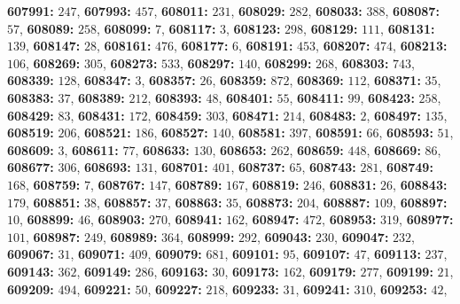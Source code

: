 \textsf{\bfseries 607991:} $247$, \textsf{\bfseries 607993:} $457$, \textsf{\bfseries 608011:} $231$, \textsf{\bfseries 608029:} $282$, \textsf{\bfseries 608033:} $388$, \textsf{\bfseries 608087:} $57$, \textsf{\bfseries 608089:} $258$, \textsf{\bfseries 608099:} $7$, \textsf{\bfseries 608117:} $3$, \textsf{\bfseries 608123:} $298$, \textsf{\bfseries 608129:} $111$, \textsf{\bfseries 608131:} $139$, \textsf{\bfseries 608147:} $28$, \textsf{\bfseries 608161:} $476$, \textsf{\bfseries 608177:} $6$, \textsf{\bfseries 608191:} $453$, \textsf{\bfseries 608207:} $474$, \textsf{\bfseries 608213:} $106$, \textsf{\bfseries 608269:} $305$, \textsf{\bfseries 608273:} $533$, \textsf{\bfseries 608297:} $140$, \textsf{\bfseries 608299:} $268$, \textsf{\bfseries 608303:} $743$, \textsf{\bfseries 608339:} $128$, \textsf{\bfseries 608347:} $3$, \textsf{\bfseries 608357:} $26$, \textsf{\bfseries 608359:} $872$, \textsf{\bfseries 608369:} $112$, \textsf{\bfseries 608371:} $35$, \textsf{\bfseries 608383:} $37$, \textsf{\bfseries 608389:} $212$, \textsf{\bfseries 608393:} $48$, \textsf{\bfseries 608401:} $55$, \textsf{\bfseries 608411:} $99$, \textsf{\bfseries 608423:} $258$, \textsf{\bfseries 608429:} $83$, \textsf{\bfseries 608431:} $172$, \textsf{\bfseries 608459:} $303$, \textsf{\bfseries 608471:} $214$, \textsf{\bfseries 608483:} $2$, \textsf{\bfseries 608497:} $135$, \textsf{\bfseries 608519:} $206$, \textsf{\bfseries 608521:} $186$, \textsf{\bfseries 608527:} $140$, \textsf{\bfseries 608581:} $397$, \textsf{\bfseries 608591:} $66$, \textsf{\bfseries 608593:} $51$, \textsf{\bfseries 608609:} $3$, \textsf{\bfseries 608611:} $77$, \textsf{\bfseries 608633:} $130$, \textsf{\bfseries 608653:} $262$, \textsf{\bfseries 608659:} $448$, \textsf{\bfseries 608669:} $86$, \textsf{\bfseries 608677:} $306$, \textsf{\bfseries 608693:} $131$, \textsf{\bfseries 608701:} $401$, \textsf{\bfseries 608737:} $65$, \textsf{\bfseries 608743:} $281$, \textsf{\bfseries 608749:} $168$, \textsf{\bfseries 608759:} $7$, \textsf{\bfseries 608767:} $147$, \textsf{\bfseries 608789:} $167$, \textsf{\bfseries 608819:} $246$, \textsf{\bfseries 608831:} $26$, \textsf{\bfseries 608843:} $179$, \textsf{\bfseries 608851:} $38$, \textsf{\bfseries 608857:} $37$, \textsf{\bfseries 608863:} $35$, \textsf{\bfseries 608873:} $204$, \textsf{\bfseries 608887:} $109$, \textsf{\bfseries 608897:} $10$, \textsf{\bfseries 608899:} $46$, \textsf{\bfseries 608903:} $270$, \textsf{\bfseries 608941:} $162$, \textsf{\bfseries 608947:} $472$, \textsf{\bfseries 608953:} $319$, \textsf{\bfseries 608977:} $101$, \textsf{\bfseries 608987:} $249$, \textsf{\bfseries 608989:} $364$, \textsf{\bfseries 608999:} $292$, \textsf{\bfseries 609043:} $230$, \textsf{\bfseries 609047:} $232$, \textsf{\bfseries 609067:} $31$, \textsf{\bfseries 609071:} $409$, \textsf{\bfseries 609079:} $681$, \textsf{\bfseries 609101:} $95$, \textsf{\bfseries 609107:} $47$, \textsf{\bfseries 609113:} $237$, \textsf{\bfseries 609143:} $362$, \textsf{\bfseries 609149:} $286$, \textsf{\bfseries 609163:} $30$, \textsf{\bfseries 609173:} $162$, \textsf{\bfseries 609179:} $277$, \textsf{\bfseries 609199:} $21$, \textsf{\bfseries 609209:} $494$, \textsf{\bfseries 609221:} $50$, \textsf{\bfseries 609227:} $218$, \textsf{\bfseries 609233:} $31$, \textsf{\bfseries 609241:} $310$, \textsf{\bfseries 609253:} $42$, 
